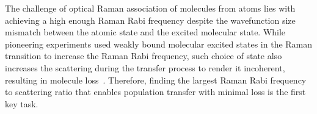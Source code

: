 \documentclass[aps,prl,twocolumn,groupedaddress]{revtex4-1}
\newcommand{\todo}[1]{}
\begin{document}


The challenge of optical Raman association of molecules from atoms lies with achieving a high enough Raman Rabi frequency despite the wavefunction size mismatch between the atomic state and the excited molecular state. While pioneering experiments used weakly bound molecular excited states in the Raman transition to increase the Raman Rabi frequency, such choice of state also increases the scattering during the transfer process to render it incoherent, resulting in molecule loss~\cite{Wynar2000,Rom2004}.
Therefore, finding the largest Raman Rabi frequency to scattering ratio that enables population transfer with minimal loss is the first key task.
\end{document}
